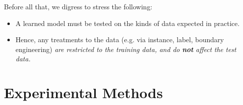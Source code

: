 \documentclass[compsoc,10pt]{IEEEtran}
\newcommand{\bi}{\begin{itemize}}
\newcommand{\ei}{\end{itemize}}
\begin{document}
 


Before all that,  we digress to   stress the following:
\bi
\item
A  learned model must be tested on the kinds of data expected in practice. 
\item
Hence,  
  any treatments to the data  (e.g.  via instance, label, boundary engineering) 
  {\em are restricted to the training data, and do {\bf not} affect the test  data.}
\ei




 




 
 




\section{Experimental Methods}
\label{sec:methods}
 









 
 
\end{document}
